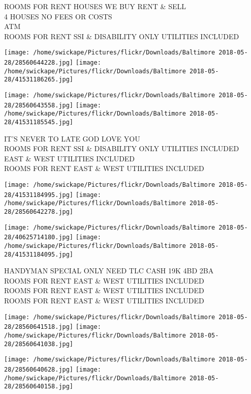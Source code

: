 \documentclass[10pt,letterpaper]{article}
\begin{document}
ROOMS FOR RENT HOUSES WE BUY RENT \& SELL\\
4 HOUSES NO FEES OR COSTS\\
ATM\\
ROOMS FOR RENT SSI \& DISABILITY ONLY UTILITIES INCLUDED\\
\pagebreak

\texttt{[image: /home/swickape/Pictures/flickr/Downloads/Baltimore 2018-05-28/28560644228.jpg]}
\texttt{[image: /home/swickape/Pictures/flickr/Downloads/Baltimore 2018-05-28/41531186265.jpg]}

\texttt{[image: /home/swickape/Pictures/flickr/Downloads/Baltimore 2018-05-28/28560643558.jpg]}
\texttt{[image: /home/swickape/Pictures/flickr/Downloads/Baltimore 2018-05-28/41531185545.jpg]}

IT'S NEVER TO LATE GOD LOVE YOU\\
ROOMS FOR RENT SSI \& DISABILITY ONLY UTILITIES INCLUDED\\
EAST \& WEST UTILITIES INCLUDED\\
ROOMS FOR RENT EAST \& WEST UTILITIES INCLUDED\\
\pagebreak

\texttt{[image: /home/swickape/Pictures/flickr/Downloads/Baltimore 2018-05-28/41531184995.jpg]}
\texttt{[image: /home/swickape/Pictures/flickr/Downloads/Baltimore 2018-05-28/28560642278.jpg]}

\texttt{[image: /home/swickape/Pictures/flickr/Downloads/Baltimore 2018-05-28/40625714180.jpg]}
\texttt{[image: /home/swickape/Pictures/flickr/Downloads/Baltimore 2018-05-28/41531184095.jpg]}

HANDYMAN SPECIAL ONLY NEED TLC CASH 19K 4BD 2BA\\
ROOMS FOR RENT EAST \& WEST UTILITIES INCLUDED\\
ROOMS FOR RENT EAST \& WEST UTILITIES INCLUDED\\
ROOMS FOR RENT EAST \& WEST UTILITIES INCLUDED\\
\pagebreak

\texttt{[image: /home/swickape/Pictures/flickr/Downloads/Baltimore 2018-05-28/28560641518.jpg]}
\texttt{[image: /home/swickape/Pictures/flickr/Downloads/Baltimore 2018-05-28/28560641038.jpg]}

\texttt{[image: /home/swickape/Pictures/flickr/Downloads/Baltimore 2018-05-28/28560640628.jpg]}
\texttt{[image: /home/swickape/Pictures/flickr/Downloads/Baltimore 2018-05-28/28560640158.jpg]}
\end{document}
